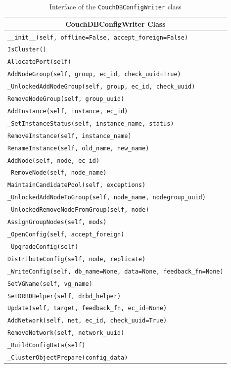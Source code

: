 \begin{description}
    \begin{table}[htbp]
      \begin{center}
      \begin{tabular}{l}
        \hline
        \multicolumn{1}{c}{\textbf{CouchDBConfigWriter Class}} \\
        \hline\hline
        \texttt{\_\_init\_\_(self, offline=False, accept\_foreign=False)} \\
        \texttt{IsCluster()} \\
        \texttt{AllocatePort(self)} \\
        \texttt{AddNodeGroup(self, group, ec\_id, check\_uuid=True)} \\
        \texttt{\_UnlockedAddNodeGroup(self, group, ec\_id, check\_uuid)} \\
        \texttt{RemoveNodeGroup(self, group\_uuid)} \\
        \texttt{AddInstance(self, instance, ec\_id)} \\
        \texttt{\_SetInstanceStatus(self, instance\_name, status)} \\
        \texttt{RemoveInstance(self, instance\_name)} \\
        \texttt{RenameInstance(self, old\_name, new\_name)} \\
        \texttt{AddNode(self, node, ec\_id)} \\
        \texttt{ RemoveNode(self, node\_name)} \\
        \texttt{MaintainCandidatePool(self, exceptions)} \\
        \texttt{\_UnlockedAddNodeToGroup(self, node\_name,
            nodegroup\_uuid)} \\
        \texttt{\_UnlockedRemoveNodeFromGroup(self, node)} \\
        \texttt{AssignGroupNodes(self, mods)} \\
        \texttt{\_OpenConfig(self, accept\_foreign)} \\
        \texttt{\_UpgradeConfig(self)} \\
        \texttt{DistributeConfig(self, node, replicate)} \\
        \texttt{\_WriteConfig(self, db\_name=None, data=None,
            feedback\_fn=None)} \\
        \texttt{SetVGName(self, vg\_name)} \\
        \texttt{SetDRBDHelper(self, drbd\_helper)} \\
        \texttt{Update(self, target, feedback\_fn, ec\_id=None)} \\
        \texttt{AddNetwork(self, net, ec\_id, check\_uuid=True)} \\
        \texttt{RemoveNetwork(self, network\_uuid)} \\
        \texttt{\_BuildConfigData(self)} \\
        \texttt{\_ClusterObjectPrepare(config\_data)} \\
        \hline
      \end{tabular}
      \end{center}
      \caption{Interface of the \texttt{CouchDBConfigWriter} class
        \label{tbl:couch_cfg}}
    \end{table}


\end{description}
